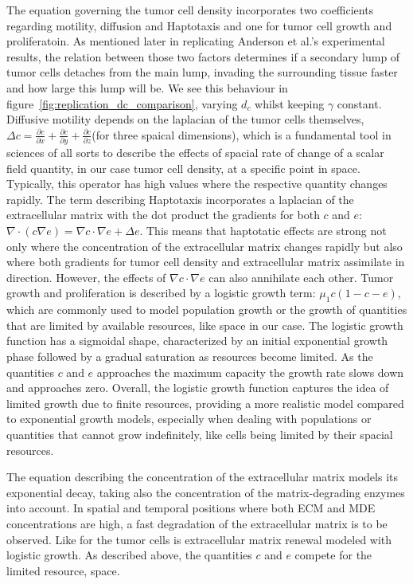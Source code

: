 The equation governing the tumor cell density incorporates two coefficients regarding motility, diffusion and Haptotaxis and one for tumor cell growth and proliferatoin. As mentioned later in replicating Anderson et al.'s experimental results, the relation between those two factors determines if a secondary lump of tumor cells detaches from the main lump, invading the surrounding tissue faster and how large this lump will be. We see this behaviour in figure~\ref{fig:replication_dc_comparison}, varying $d_c$ whilst keeping $\gamma$ constant. Diffusive motility depends on the laplacian of the tumor cells themselves, $\Delta c = \frac{\partial c}{\partial x} + \frac{\partial c}{\partial y} + \frac{\partial c}{\partial z}$(for three spaical dimensions), which is a fundamental tool in sciences of all sorts to describe the effects of spacial rate of change of a scalar field quantity, in our case tumor cell density, at a specific point in space. Typically, this operator has high values where the respective quantity changes rapidly. The term describing Haptotaxis incorporates a laplacian of the extracellular matrix with the dot product the gradients for both $c$ and $e$: $\nabla \cdot (c\nabla e) = \nabla c \cdot \nabla e + \Delta e$. This means that haptotatic effects are strong not only where the concentration of the extracellular matrix changes rapidly but also where both gradients for tumor cell density and extracellular matrix assimilate in direction. However, the effects of $\nabla c \cdot \nabla e$ can also annihilate each other. Tumor growth and proliferation is described by a logistic growth term: $\mu_1 c (1-c-e)$, which are commonly used to model population growth or the growth of quantities that are limited by available resources, like space in our case. The logistic growth function has a sigmoidal shape, characterized by an initial exponential growth phase followed by a gradual saturation as resources become limited. As the quantities $c$ and $e$ approaches the maximum capacity the growth rate slows down and approaches zero. Overall, the logistic growth function captures the idea of limited growth due to finite resources, providing a more realistic model compared to exponential growth models, especially when dealing with populations or quantities that cannot grow indefinitely, like cells being limited by their spacial resources.

The equation describing the concentration of the extracellular matrix models its exponential decay, taking also the concentration of the matrix-degrading enzymes into account. In spatial and temporal positions where both ECM and MDE concentrations are high, a fast degradation of the extracellular matrix is to be observed. Like for the tumor cells is extracellular matrix renewal modeled with logistic growth. As described above, the quantities $c$ and $e$ compete for the limited resource, space.

